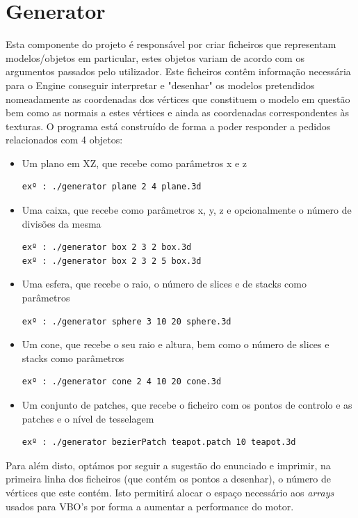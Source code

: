 \documentclass{article}
\begin{document}
\section{Generator}
Esta componente do projeto é responsável por criar ficheiros que representam modelos/objetos em particular, estes objetos variam de acordo com os argumentos passados pelo utilizador. Este ficheiros contêm informação necessária para o Engine conseguir interpretar e "desenhar" os modelos pretendidos nomeadamente as coordenadas dos vértices que constituem o modelo em questão bem como as normais a estes vértices e ainda as coordenadas correspondentes às texturas. 
O programa está construído de forma a poder responder a pedidos relacionados com 4 objetos:
\begin{itemize}
    \item Um plano em XZ, que recebe como parâmetros x e z
        \begin{verbatim}
exº : ./generator plane 2 4 plane.3d
        \end{verbatim}
    \item Uma caixa, que recebe como parâmetros x, y, z e opcionalmente o número de divisões da mesma
        \begin{verbatim}
exº : ./generator box 2 3 2 box.3d
exº : ./generator box 2 3 2 5 box.3d
        \end{verbatim}
    \item Uma esfera, que recebe o raio, o número de slices e de stacks como parâmetros
        \begin{verbatim}
exº : ./generator sphere 3 10 20 sphere.3d
        \end{verbatim}
    \item Um cone, que recebe o seu raio e altura, bem como o número de slices e stacks como parâmetros
        \begin{verbatim}
exº : ./generator cone 2 4 10 20 cone.3d
        \end{verbatim}
    \item Um conjunto de patches, que recebe o ficheiro com os pontos de controlo e as patches e o nível de tesselagem
        \begin{verbatim}
exº : ./generator bezierPatch teapot.patch 10 teapot.3d
        \end{verbatim}
\end{itemize}
Para além disto, optámos por seguir a sugestão do enunciado e imprimir, na primeira linha dos ficheiros (que contém os pontos a desenhar), o número de vértices que este contém. Isto permitirá alocar o espaço necessário aos \textit{arrays} usados para VBO's por forma a aumentar a performance do motor.
\end{document}
